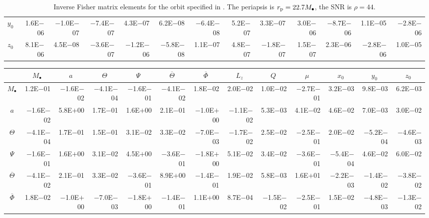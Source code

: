 \begin{sidewaystable}[htbp]
\begin{tabular}{crrrrrrrrrrrr}
$y_0$ & 1.6E$-$06 & $-$1.0E$-$07 & $-$7.4E$-$07 & 4.3E$-$07 & 6.2E$-$08 & $-$6.4E$-$08 & 5.2E$-$07 & 3.3E$-$07 & 3.0E$-$06 & $-$8.7E$-$06 & 1.1E$-$05 & $-$2.8E$-$06 \\
$z_0$ & 8.1E$-$06 & 4.5E$-$08 & $-$3.6E$-$07 & $-$1.2E$-$06 & $-$5.8E$-$08 & 1.1E$-$07 & 4.8E$-$07 & $-$1.8E$-$07 & 1.5E$-$07 & 2.3E$-$06 & $-$2.8E$-$06 & 1.0E$-$05 \\
\bottomrule
\end{tabular}
\caption{Inverse Fisher matrix elements for the orbit specified in . The periapsis is $r_\mathrm{p} = 22.7 M_\bullet$, the SNR is $\rho = 44$.}
\label{tab:Fisher_6}
\end{sidewaystable}
\begin{sidewaystable}[htbp]\scriptsize
\centering
\begin{tabular}{crrrrrrrrrrrr}
\toprule
 & \multicolumn{1}{c}{$M_\bullet$} & \multicolumn{1}{c}{$a$} & \multicolumn{1}{c}{$\Theta$} & \multicolumn{1}{c}{$\Psi$} & \multicolumn{1}{c}{$\overline{\Theta}$} & \multicolumn{1}{c}{$\overline{\Phi}$} & \multicolumn{1}{c}{$L_z$} & \multicolumn{1}{c}{$Q$} & \multicolumn{1}{c}{$\mu$} & \multicolumn{1}{c}{$x_0$} & \multicolumn{1}{c}{$y_0$} & \multicolumn{1}{c}{$z_0$} \\ \midrule 
$M_\bullet$ & 1.2E$-$01 & $-$1.6E$-$02 & $-$4.1E$-$04 & $-$1.6E$-$01 & $-$4.1E$-$02 & 1.8E$-$02 & 2.0E$-$02 & 1.0E$-$02 & $-$2.7E$-$01 & 3.2E$-$03 & 9.8E$-$03 & 6.2E$-$03 \\
$a$ & $-$1.6E$-$02 & 5.8E$+$00 & 1.7E$-$01 & 1.6E$+$00 & 2.1E$-$01 & $-$1.0E$+$00 & $-$1.1E$-$02 & 5.3E$-$03 & 4.1E$-$02 & 4.6E$-$02 & 7.0E$-$03 & 3.0E$-$02 \\
$\Theta$ & $-$4.1E$-$04 & 1.7E$-$01 & 1.5E$-$01 & 3.1E$-$02 & 3.3E$-$02 & $-$7.0E$-$03 & $-$1.7E$-$02 & 2.5E$-$02 & $-$2.5E$-$01 & 2.0E$-$02 & $-$5.2E$-$04 & $-$4.6E$-$03 \\
$\Psi$ & $-$1.6E$-$01 & 1.6E$+$00 & 3.1E$-$02 & 4.5E$+$00 & $-$3.6E$-$01 & $-$1.8E$+$00 & 5.1E$-$02 & 3.4E$-$02 & $-$3.6E$-$01 & $-$5.4E$-$04 & 4.6E$-$02 & 6.0E$-$02 \\
$\overline{\Theta}$ & $-$4.1E$-$02 & 2.1E$-$01 & 3.3E$-$02 & $-$3.6E$-$01 & 8.9E$+$00 & $-$1.4E$-$01 & 1.9E$-$02 & 5.8E$-$03 & 1.6E$+$01 & $-$2.2E$-$03 & $-$1.4E$-$02 & $-$3.8E$-$02 \\
$\overline{\Phi}$ & 1.8E$-$02 & $-$1.0E$+$00 & $-$7.0E$-$03 & $-$1.8E$+$00 & $-$1.4E$-$01 & 1.1E$+$00 & 8.7E$-$04 & $-$1.5E$-$02 & $-$2.5E$-$01 & 1.5E$-$02 & $-$4.8E$-$03 & $-$1.3E$-$02 \\

\end{tabular}
\end{sidewaystable}
